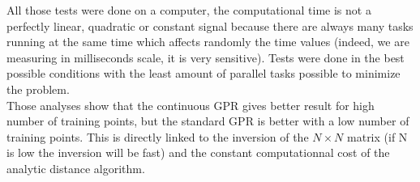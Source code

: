 All those tests were done on a computer, the computational time is not a perfectly linear, quadratic or constant signal because there are always many tasks running at the same time which affects randomly the time values (indeed, we are measuring in milliseconds scale, it is very sensitive). Tests were done in the best possible conditions with the least amount of parallel tasks possible to minimize the problem.\\

Those analyses show that the continuous GPR gives better result for high number of training points, but the standard GPR is better with a low number of training points. This is directly linked to the inversion of the $N \times N$ matrix (if N is low the inversion will be fast) and the constant computationnal cost of the analytic distance algorithm.

